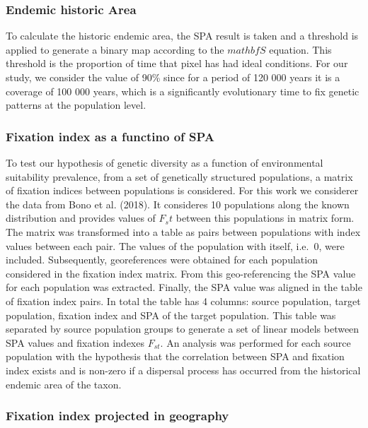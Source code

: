\documentclass[
]{article}
\begin{document}
\hypertarget{endemic-historic-area}{%
\subsubsection{Endemic historic Area}\label{endemic-historic-area}}

To calculate the historic endemic area, the SPA result is taken and a
threshold is applied to generate a binary map according to the
\(mathbf{S}\) equation. This threshold is the proportion of time that
pixel has had ideal conditions. For our study, we consider the value of
90\% since for a period of 120 000 years it is a coverage of 100 000
years, which is a significantly evolutionary time to fix genetic
patterns at the population level.

\hypertarget{fixation-index-as-a-functino-of-spa}{%
\subsubsection{Fixation index as a functino of
SPA}\label{fixation-index-as-a-functino-of-spa}}

To test our hypothesis of genetic diversity as a function of
environmental suitability prevalence, from a set of genetically
structured populations, a matrix of fixation indices between populations
is considered. For this work we considerer the data from Bono et al.
(2018). It consideres 10 populations along the known distribution and
provides values of \(F_st\) between this populations in matrix form. The
matrix was transformed into a table as pairs between populations with
index values between each pair. The values of the population with
itself, i.e.~\(0\), were included. Subsequently, georeferences were
obtained for each population considered in the fixation index matrix.
From this geo-referencing the SPA value for each population was
extracted. Finally, the SPA value was aligned in the table of fixation
index pairs. In total the table has 4 columns: source population, target
population, fixation index and SPA of the target population. This table
was separated by source population groups to generate a set of linear
models between SPA values and fixation indexes \(F_{st}\). An analysis
was performed for each source population with the hypothesis that the
correlation between SPA and fixation index exists and is non-zero if a
dispersal process has occurred from the historical endemic area of the
taxon.

\hypertarget{fixation-index-projected-in-geography}{%
\subsubsection{Fixation index projected in
geography}\label{fixation-index-projected-in-geography}}
\end{document}
